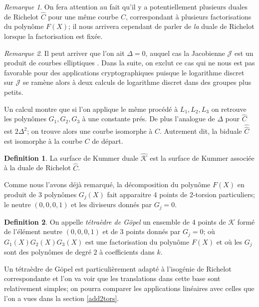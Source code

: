 \documentclass[a4paper,12pt]{article}
\theoremstyle{definition}
\newtheorem{definition}{Definition}[section]
\theoremstyle{remark}
\newtheorem{remarque}{Remarque}
\numberwithin{equation}{section}
\begin{document}
\begin{remarque}
On fera attention au fait qu'il y a potentiellement plusieurs duales de Richelot $\hat{C}$ pour une même courbe $C$, correspondant à plusieurs factorisations du polynôme $F(X)$; il nous arrivera cependant de parler de \emph{la} duale de Richelot lorsque la factorisation est fixée.
\end{remarque}

\begin{remarque}
Il peut arriver que l'on ait $\Delta = 0$, auquel cas la Jacobienne $\mathcal{J}$ est un produit de courbes elliptiques \citep{cassels-Flynn}. Dans la suite, on exclut ce cas qui ne nous est pas favorable pour des applications cryptographiques puisque le logarithme discret sur $\mathcal{J}$ se ramène alors à deux calculs de logarithme discret dans des groupes plus petits.
\end{remarque}

Un calcul montre que si l'on applique le même procédé à $L_1,L_2,L_3$ on retrouve les polynômes $G_1,G_2,G_3$ à une constante prés. De plus l'analogue de $\Delta$ pour $\hat{C}$ est $2\Delta^2$; on trouve alors une courbe isomorphe à $C$. Autrement dit, la biduale $\hat{\hat{C}}$ est isomorphe à la courbe $C$ de départ.

\begin{definition}
La surface de Kummer duale $\hat{\mathcal{K}}$ est la surface de Kummer associée à la duale de Richelot $\hat{C}$.
\end{definition}

Comme nous l'avons déjà remarqué, la décomposition du polynôme $F(X)$ en produit de 3 polynômes $G_j(X)$ fait apparaitre 4 points de 2-torsion particuliers; le neutre $(0,0,0,1)$ et les diviseurs donnés par $G_j=0$.

\begin{definition}
On appelle \emph{tétraèdre de G\"opel} un ensemble de 4 points de $\mathcal{K}$ formé de l'élément neutre $(0,0,0,1)$ et de 3 points donnés par $G_j=0$; où $G_1(X)G_2(X)G_3(X)$ est une factorisation du polynôme $F(X)$ et où les $G_j$ sont des polynômes de degré $2$ à coefficients dans $k$.
\end{definition}

Un tétraèdre de G\"opel est particulièrement adapté à l'isogénie de Richelot correspondante et l'on va voir que les translations dans cette base sont relativement simples; on pourra comparer les applications linéaires avec celles que l'on a vues dans la section \ref{add2tors}.
\end{document}
